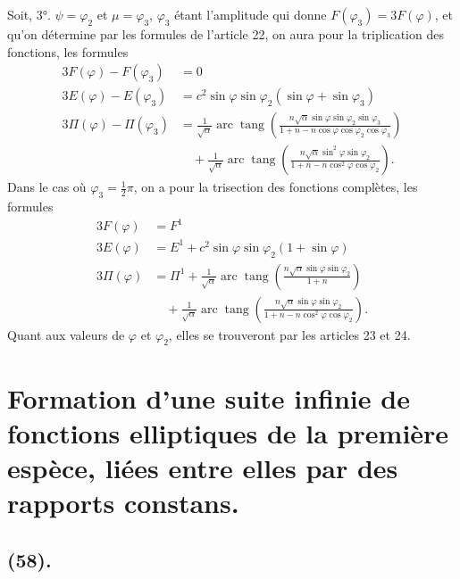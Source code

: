 \documentclass{article}
\begin{document}
Soit, 3°. $\psi=\varphi_{2}$ et $\mu=\varphi_{3}$, $\varphi_{3}$ étant l'amplitude qui donne $F(\varphi_{3})=3F(\varphi)$, et qu'on détermine par les formules de l'article 22, on aura pour la triplication des fonctions, les formules
\[ \begin{aligned} 3F(\varphi)-F(\varphi_{3})&=0\\ 3E(\varphi)-E(\varphi_{3})&=c^{2}\sin\varphi\sin\varphi_{2}(\sin\varphi+\sin\varphi_{3})\\ 3\Pi(\varphi)-\Pi(\varphi_{3})&=\frac{1}{\sqrt{\alpha}}\operatorname{arc}\operatorname{tang}\left(\frac{n\sqrt{\alpha}\sin\varphi\sin\varphi_{2}\sin\varphi_{3}}{1+n-n\cos\varphi\cos\varphi_{2}\cos\varphi_{3}}\right)\\ &\quad+\frac{1}{\sqrt{\alpha}}\operatorname{arc}\operatorname{tang}\left(\frac{n\sqrt{\alpha}\sin^{2}\varphi\sin\varphi_{2}}{1+n-n\cos^{2}\varphi\cos\varphi_{2}}\right). \end{aligned} \]
Dans le cas où $\varphi_{3}=\frac{1}{2}\pi$, on a pour la trisection des fonctions complètes, les formules
\[ \begin{aligned} 3F(\varphi)&=F^{1}\\ 3E(\varphi)&=E^{1}+c^{2}\sin\varphi\sin\varphi_{2}(1+\sin\varphi)\\ 3\Pi(\varphi)&=\Pi^{1}+\frac{1}{\sqrt{\alpha}}\operatorname{arc}\operatorname{tang}\left(\frac{n\sqrt{\alpha}\sin\varphi\sin\varphi_{2}}{1+n}\right)\\ &\quad+\frac{1}{\sqrt{\alpha}}\operatorname{arc}\operatorname{tang}\left(\frac{n\sqrt{\alpha}\sin\varphi\sin\varphi_{2}}{1+n-n\cos^{2}\varphi\cos\varphi_{2}}\right). \end{aligned} \]
Quant aux valeurs de $\varphi$ et $\varphi_{2}$, elles se trouveront par les articles 23 et 24.

\section*{Formation d'une suite infinie de fonctions elliptiques de la première espèce, liées entre elles par des rapports constans.}

\subsection*{(58).}
\end{document}
